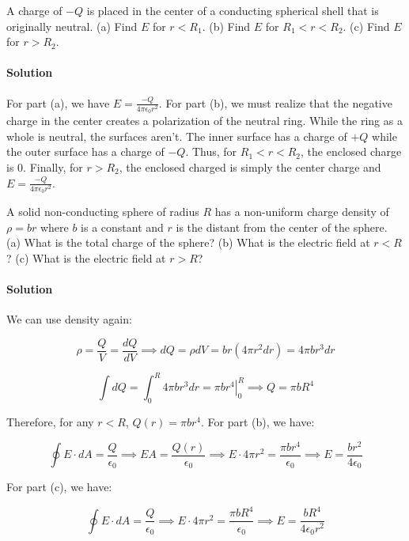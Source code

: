 \documentclass{scrartcl}
\theoremstyle{definition}
\begin{document}
	\begin{example}
		A charge of $-Q$ is placed in the center of a conducting spherical shell that is originally neutral. (a) Find $E$ for $r < R_1$. (b) Find $E$ for $R_1 < r < R_2$. (c) Find $E$ for $r > R_2$.
	\end{example}
	
	\paragraph{Solution} For part (a), we have $E = \frac{-Q}{4 \pi \epsilon_0 r^2}$. For part (b), we must realize that the negative charge in the center creates a polarization of the neutral ring. While the ring as a whole is neutral, the surfaces aren't. The inner surface has a charge of $+Q$ while the outer surface has a charge of $-Q$. Thus, for $R_1 < r < R_2$, the enclosed charge is $0$. Finally, for $r > R_2$, the enclosed charged is simply the center charge and $E = \frac{-Q}{4 \pi \epsilon_0 r^2}$.
	
	\begin{example}
		A solid non-conducting sphere of radius $R$ has a non-uniform charge density of $\rho = br$ where $b$ is a constant and $r$ is the distant from the center of the sphere. (a) What is the total charge of the sphere? (b) What is the electric field at $r < R$? (c) What is the electric field at $r > R$?
	\end{example}
	
	\paragraph{Solution} We can use density again:
	
	$$
	\rho = \frac{Q}{V} = \frac{dQ}{dV} \implies dQ = \rho dV = br(4 \pi r^2dr) = 4 \pi br^3 dr
	$$
	
	$$
	\int dQ = \int_0^R 4 \pi br^3 dr = \left. \pi br^4 \right|_0^R \implies Q = \pi bR^4
	$$
	
	\noindent Therefore, for any $r < R$, $Q(r) = \pi br^4$. For part (b), we have:
	
	$$
	\oint E \cdot dA = \frac{Q}{\epsilon_0} \implies EA = \frac{Q(r)}{\epsilon_0} \implies E \cdot 4 \pi r^2 = \frac{\pi br^4}{\epsilon_0} \implies E = \frac{br^2}{4 \epsilon_0}
	$$
	
	\noindent For part (c), we have:
	
	$$
	\oint E \cdot dA = \frac{Q}{\epsilon_0} \implies E \cdot 4 \pi r^2 = \frac{\pi b R^4}{\epsilon_0} \implies E = \frac{bR^4}{4 \epsilon_0r^2}
	$$
	
\end{document}
